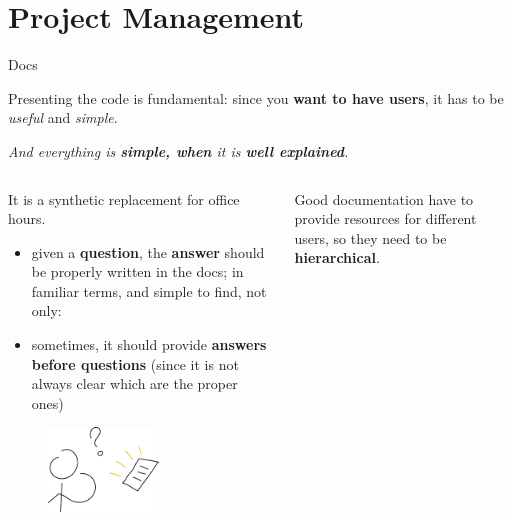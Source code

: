 \documentclass[9pt]{beamer}
\begin{document}
\section{Project Management}

\begin{frame}{Docs}
    \vspace*{20pt}
    \begin{center}
        Presenting the code is fundamental: since you \textbf{want to have
        users}, it has to be \textit{useful} and \textit{simple}.

        \textit{And everything is \textbf{simple, when} it is
        \alert{\textbf{well explained}}.}
    \end{center}
    \vspace*{10pt}

    \begin{columns}
        \begin{column}{0.35\textwidth}
            It is a synthetic replacement for office hours.
            \vspace*{10pt}

            \begin{itemize}
                \item given a \textbf{question}, the \textbf{answer} should be
                  properly written in the docs; in familiar terms, and simple
                  to find, not only: 
                \item sometimes, it should provide \textbf{answers before
                  questions} (since it is not always clear which are the proper
                  ones)
            \end{itemize}

            \begin{figure}
                \centering
                \includegraphics[width=0.6\textwidth]{question-docs}
            \end{figure}
        \end{column}
        \begin{column}{0.35\textwidth}
            Good documentation have to provide resources for different users,
            so they need to be \textbf{hierarchical}.
            \vspace*{10pt}


\end{column}
\end{columns}
\end{frame}
\end{document}
